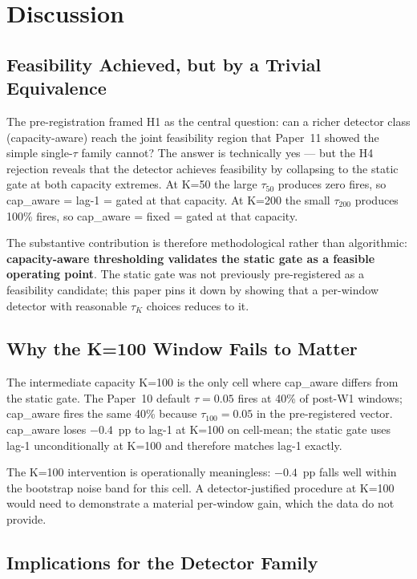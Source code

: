 \section{Discussion}

\subsection{Feasibility Achieved, but by a Trivial Equivalence}

The pre-registration framed H1 as the central question: can a richer
detector class (capacity-aware) reach the joint feasibility region
that Paper~11 showed the simple single-$\tau$ family cannot? The
answer is technically yes --- but the H4 rejection reveals that the
detector achieves feasibility by collapsing to the static gate at
both capacity extremes. At K=50 the large $\tau_{50}$ produces zero
fires, so cap\_aware = lag-1 = gated at that capacity. At K=200 the
small $\tau_{200}$ produces 100\% fires, so cap\_aware = fixed = gated
at that capacity.

The substantive contribution is therefore methodological rather
than algorithmic: \textbf{capacity-aware thresholding validates the
static gate as a feasible operating point}. The static gate was
not previously pre-registered as a feasibility candidate; this paper
pins it down by showing that a per-window detector with reasonable
$\tau_K$ choices reduces to it.

\subsection{Why the K=100 Window Fails to Matter}

The intermediate capacity K=100 is the only cell where cap\_aware
differs from the static gate. The Paper~10 default $\tau = 0.05$
fires at 40\% of post-W1 windows; cap\_aware fires the same 40\%
because $\tau_{100} = 0.05$ in the pre-registered vector. cap\_aware
loses $-0.4$~pp to lag-1 at K=100 on cell-mean; the static gate uses
lag-1 unconditionally at K=100 and therefore matches lag-1 exactly.

The K=100 intervention is operationally meaningless: $-0.4$~pp falls
well within the bootstrap noise band for this cell. A
detector-justified procedure at K=100 would need to demonstrate a
material per-window gain, which the data do not provide.

\subsection{Implications for the Detector Family}

